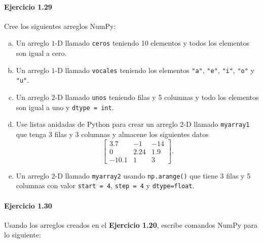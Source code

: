 \paragraph{\color{DarkBlue}Ejercicio 1.29}
Cree los siguientes arreglos NumPy:

\begin{enumerate}[(a)]
	\item

	      Un arreglo $1$-D llamado \texttt{ceros} teniendo
	      10 elementos y todos los elementos son igual a cero.

	\item

	      Un arreglo $1$-D llamado \texttt{vocales}
	      teniendo los elementos \texttt{"a"},
	      \texttt{"e"}, \texttt{"i"},
	      \texttt{"o"} y \texttt{"u"}.

	\item

	      Un arreglo $2$-D llamado \texttt{unos} teniendo
	      filas y 5 columnas y todo los elementos son igual a uno y
	      \texttt{dtype = int}.

	\item

	      Use listas anidadas de Python para crear un arreglo 2-D
	      llamado \texttt{myarray1} que tenga 3 filas y 3
	      columnas y almacene los siguientes datos
	      \begin{equation*}
		      \begin{bmatrix}
			      3.7   & -1   & -14 \\
			      0     & 2.24 & 1.9 \\
			      -10.1 & 1    & 3
		      \end{bmatrix}.
	      \end{equation*}

	\item

	      Un arreglo $2$-D llamado \texttt{myarray2} usando
	      \texttt{np.arange()} que tiene 3 filas y 5
	      columnas con valor \texttt{start = 4},
	      \texttt{step = 4} y
	      \texttt{dtype=float}.
\end{enumerate}

\paragraph{\color{DarkBlue}Ejercicio 1.30}
Usando los arreglos creados en el \textbf{Ejercicio 1.20},
escribe comandos NumPy para lo siguiente:

